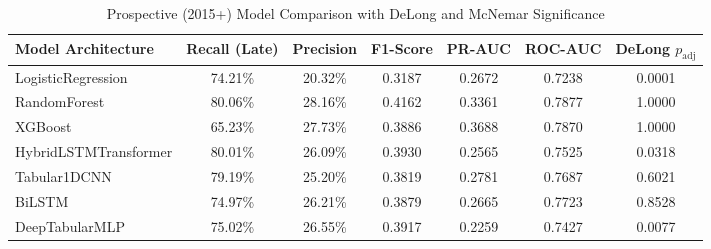 \begin{table}[htbp]
\centering
\caption{Prospective (2015+) Model Comparison with DeLong and McNemar Significance}
\label{tab:model_comparison}
\small
\begin{tabular}{lcccccc}
\toprule
\textbf{Model Architecture} & \textbf{Recall (Late)} & \textbf{Precision} & \textbf{F1-Score} & \textbf{PR-AUC} & \textbf{ROC-AUC} & \textbf{DeLong $p_{\text{adj}}$} \\
\midrule
LogisticRegression & 74.21\% & 20.32\% & 0.3187 & 0.2672 & 0.7238 & 0.0001 \\
RandomForest & 80.06\% & 28.16\% & 0.4162 & 0.3361 & 0.7877 & 1.0000 \\
XGBoost & 65.23\% & 27.73\% & 0.3886 & 0.3688 & 0.7870 & 1.0000 \\
HybridLSTMTransformer & 80.01\% & 26.09\% & 0.3930 & 0.2565 & 0.7525 & 0.0318 \\
Tabular1DCNN & 79.19\% & 25.20\% & 0.3819 & 0.2781 & 0.7687 & 0.6021 \\
BiLSTM & 74.97\% & 26.21\% & 0.3879 & 0.2665 & 0.7723 & 0.8528 \\
DeepTabularMLP & 75.02\% & 26.55\% & 0.3917 & 0.2259 & 0.7427 & 0.0077 \\
\bottomrule
\end{tabular}
\end{table}